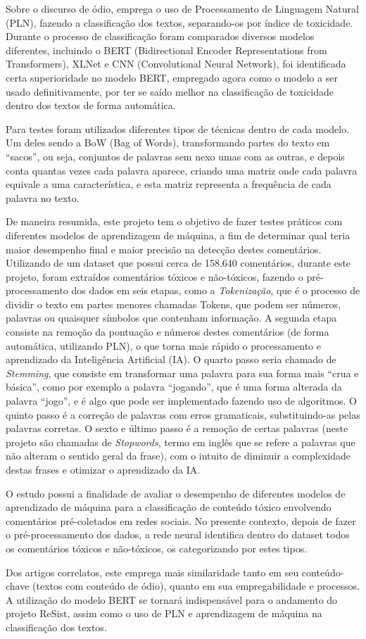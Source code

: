 Sobre o discurso de ódio, \textcite{toxist} emprega o uso de Processamento de Linguagem Natural (PLN), fazendo a classificação dos textos, separando-os por índice de toxicidade. Durante o processo de classificação foram comparados diversos modelos diferentes, incluindo o BERT (Bidirectional Encoder Representations from Transformers), XLNet e CNN (Convolutional Neural Network), foi identificada certa superioridade no modelo BERT, empregado agora como o modelo a ser usado definitivamente, por ter se saído melhor na classificação de toxicidade dentro dos textos de forma automática. 

Para testes foram utilizados diferentes tipos de técnicas dentro de cada modelo. Um deles sendo a BoW (Bag of Words), transformando partes do texto em “sacos”, ou seja, conjuntos de palavras sem nexo umas com as outras, e depois conta quantas vezes cada palavra aparece, criando uma matriz onde cada palavra equivale a uma característica, e esta matriz representa a frequência de cada palavra no texto.

De maneira resumida, este projeto tem o objetivo de fazer testes práticos com diferentes modelos de aprendizagem de máquina, a fim de determinar qual teria maior desempenho final e maior precisão na detecção destes comentários. Utilizando de um dataset que possui cerca de 158.640 comentários, durante este projeto, foram extraídos comentários tóxicos e não-tóxicos, fazendo o pré-processamento dos dados em seis etapas, como a \textit{Tokenização}, que é o processo de dividir o texto em partes menores chamadas Tokens, que podem ser números, palavras ou quaisquer símbolos que contenham informação. A segunda etapa consiste na remoção da pontuação e números destes comentários (de forma automática, utilizando PLN), o que torna mais rápido o processamento e aprendizado da Inteligência Artificial (IA). O quarto passo seria chamado de \textit{Stemming}, que consiste em transformar uma palavra para sua forma mais “crua e básica”, como por exemplo a palavra “jogando”, que é uma forma alterada da palavra “jogo”, e é algo que pode ser implementado fazendo uso de algoritmos.  O quinto passo é a correção de palavras com erros gramaticais, substituindo-as pelas palavras corretas. O sexto e último passo é a remoção de certas palavras (neste projeto são chamadas de \textit{Stopwords}, termo em inglês que se refere a palavras que não alteram o sentido geral da frase), com o intuito de diminuir a complexidade destas frases e otimizar o aprendizado da IA.

O estudo possui a finalidade de avaliar o desempenho de diferentes modelos de aprendizado de máquina para a classificação de conteúdo tóxico envolvendo comentários pré-coletados em redes sociais. No presente contexto, depois de fazer o pré-processamento dos dados, a rede neural identifica dentro do dataset todos os comentários tóxicos e não-tóxicos, os categorizando por estes tipos. 

Dos artigos correlatos, este emprega mais similaridade tanto em seu conteúdo-chave (textos com conteúdo de ódio), quanto em sua empregabilidade e processos. A utilização do modelo BERT se tornará indispensável para o andamento do projeto ReSist, assim como o uso de PLN e aprendizagem de máquina na classificação dos textos. 